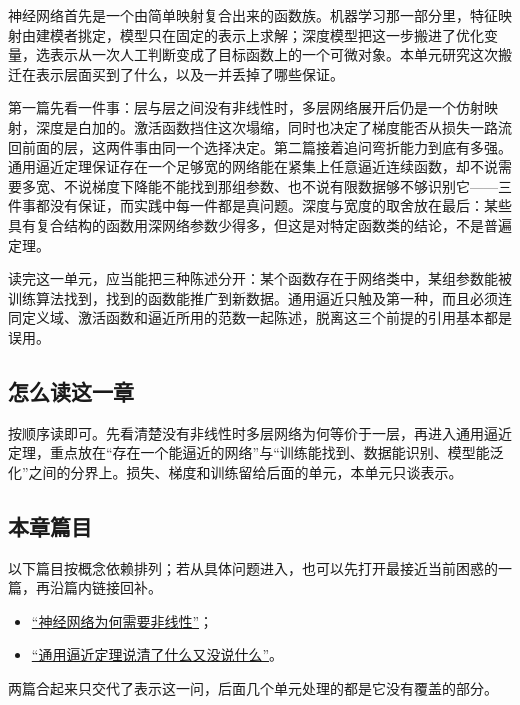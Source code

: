 神经网络首先是一个由简单映射复合出来的函数族。机器学习那一部分里，特征映射由建模者挑定，模型只在固定的表示上求解；深度模型把这一步搬进了优化变量，选表示从一次人工判断变成了目标函数上的一个可微对象。本单元研究这次搬迁在表示层面买到了什么，以及一并丢掉了哪些保证。

第一篇先看一件事：层与层之间没有非线性时，多层网络展开后仍是一个仿射映射，深度是白加的。激活函数挡住这次塌缩，同时也决定了梯度能否从损失一路流回前面的层，这两件事由同一个选择决定。第二篇接着追问弯折能力到底有多强。通用逼近定理保证存在一个足够宽的网络能在紧集上任意逼近连续函数，却不说需要多宽、不说梯度下降能不能找到那组参数、也不说有限数据够不够识别它——三件事都没有保证，而实践中每一件都是真问题。深度与宽度的取舍放在最后：某些具有复合结构的函数用深网络参数少得多，但这是对特定函数类的结论，不是普遍定理。

读完这一单元，应当能把三种陈述分开：某个函数存在于网络类中，某组参数能被训练算法找到，找到的函数能推广到新数据。通用逼近只触及第一种，而且必须连同定义域、激活函数和逼近所用的范数一起陈述，脱离这三个前提的引用基本都是误用。

\subsection{怎么读这一章}

按顺序读即可。先看清楚没有非线性时多层网络为何等价于一层，再进入通用逼近定理，重点放在``存在一个能逼近的网络''与``训练能找到、数据能识别、模型能泛化''之间的分界上。损失、梯度和训练留给后面的单元，本单元只谈表示。

\subsection{本章篇目}

以下篇目按概念依赖排列；若从具体问题进入，也可以先打开最接近当前困惑的一篇，再沿篇内链接回补。

\begin{itemize}
\tightlist
\item \hyperref[sec:14-Deep-Learning/01-Representation-and-Approximation/01]{``神经网络为何需要非线性''}；
\item \hyperref[sec:14-Deep-Learning/01-Representation-and-Approximation/02]{``通用逼近定理说清了什么又没说什么''}。
\end{itemize}

两篇合起来只交代了表示这一问，后面几个单元处理的都是它没有覆盖的部分。
